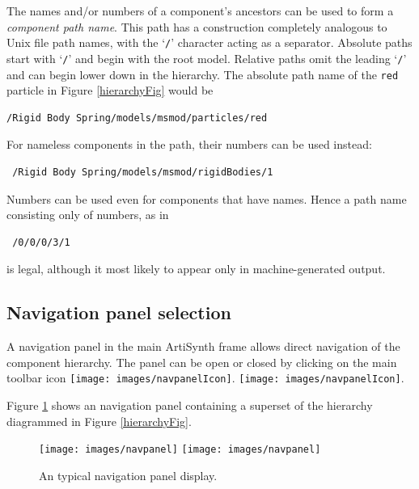 \documentclass{article}
\begin{document}
The names and/or numbers of a component's ancestors can be used to
form a {\it component path name}. This path has a construction completely
analogous to Unix file path names, with the `{\tt /}' character acting as
a separator. Absolute paths start with `{\tt /}' and begin with the root
model. Relative paths omit the leading `{\tt /}' and can begin lower down
in the hierarchy.  The absolute path name of the {\tt red} particle in
Figure \ref{hierarchyFig} would be

\begin{verbatim}
/Rigid Body Spring/models/msmod/particles/red
\end{verbatim}

For nameless components in the path, their
numbers can be used instead:

\begin{verbatim}
 /Rigid Body Spring/models/msmod/rigidBodies/1
\end{verbatim}

Numbers can be used even for components that have names.
Hence a path name consisting only of numbers, as in

\begin{verbatim}
 /0/0/0/3/1
\end{verbatim}

is legal, although it most likely to appear only in machine-generated
output.

\subsection{Navigation panel selection}
\label{navPanelSec}

A navigation panel in the main ArtiSynth frame allows direct
navigation of the component hierarchy. The panel can be
open or closed by clicking on the main toolbar icon 
\iflatexml
\texttt{[image: images/navpanelIcon]}.
\else
\texttt{[image: images/navpanelIcon]}.
\fi

Figure \ref{navpanelFig} shows an navigation panel containing a superset
of the hierarchy diagrammed in Figure \ref{hierarchyFig}.

\begin{figure}
\begin{center}
\iflatexml
\texttt{[image: images/navpanel]}
\else
\texttt{[image: images/navpanel]}
\fi
\end{center}
\caption{An typical navigation panel display.}%
\label{navpanelFig}
\end{figure}
\end{document}
